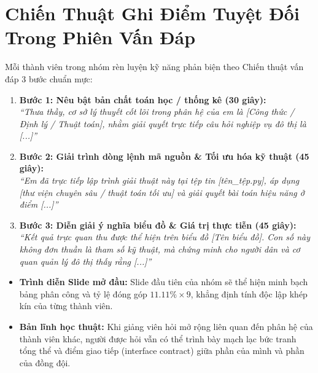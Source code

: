 \documentclass[11pt,a4paper]{article}
\begin{document}
\section{Chiến Thuật Ghi Điểm Tuyệt Đối Trong Phiên Vấn Đáp}

Mỗi thành viên trong nhóm rèn luyện kỹ năng phản biện theo Chiến thuật vấn đáp 3 bước chuẩn mực:

\begin{tcolorbox}[colback=red!5!white, colframe=red!60!black, fonttitle=\bfseries\color{white}, title={CHIẾN THUẬT VẤN ĐÁP 3 BƯỚC CHO MỖI THÀNH VIÊN (120 GIÂY)}]
\begin{enumerate}[leftmargin=*]
    \item \textbf{Bước 1: Nêu bật bản chất toán học / thống kê (30 giây):}\\
    \textit{“Thưa thầy, cơ sở lý thuyết cốt lõi trong phân hệ của em là [Công thức / Định lý / Thuật toán], nhằm giải quyết trực tiếp câu hỏi nghiệp vụ đô thị là [...]”}
    \item \textbf{Bước 2: Giải trình dòng lệnh mã nguồn \& Tối ưu hóa kỹ thuật (45 giây):}\\
    \textit{“Em đã trực tiếp lập trình giải thuật này tại tệp tin [tên\_tệp.py], áp dụng [thư viện chuyên sâu / thuật toán tối ưu] và giải quyết bài toán hiệu năng ở điểm [...]”}
    \item \textbf{Bước 3: Diễn giải ý nghĩa biểu đồ \& Giá trị thực tiễn (45 giây):}\\
    \textit{“Kết quả trực quan thu được thể hiện trên biểu đồ [Tên biểu đồ]. Con số này không đơn thuần là tham số kỹ thuật, mà chứng minh cho người dân và cơ quan quản lý đô thị thấy rằng [...]”}
\end{enumerate}
\end{tcolorbox}

\begin{itemize}
    \item \textbf{Trình diễn Slide mở đầu:} Slide đầu tiên của nhóm sẽ thể hiện minh bạch bảng phân công và tỷ lệ đóng góp $11.11\% \times 9$, khẳng định tính độc lập khép kín của từng thành viên.
    \item \textbf{Bản lĩnh học thuật:} Khi giảng viên hỏi mở rộng liên quan đến phân hệ của thành viên khác, người được hỏi vẫn có thể trình bày mạch lạc bức tranh tổng thể và điểm giao tiếp (interface contract) giữa phần của mình và phần của đồng đội.
\end{itemize}
\end{document}

